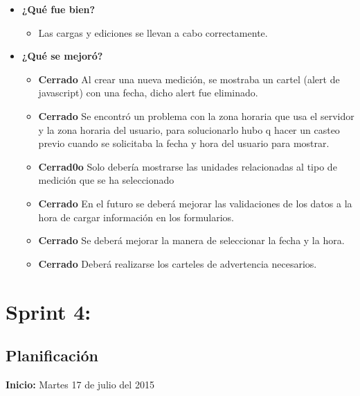 \documentclass[a4paper,12pt]{article}
\begin{document}
	\begin{itemize}
		\item \textbf{¿Qué fue bien?}
        	\begin{itemize}
				\item        Las cargas y ediciones se llevan a cabo correctamente.
			\end{itemize}

   		\item \textbf{¿Qué se mejoró?}
        	\begin{itemize}
				\item \textbf{Cerrado} Al crear una nueva medición, se mostraba un cartel (alert de javascript) con una fecha, dicho alert fue eliminado.
                \item \textbf{Cerrado} Se encontró un problema con la zona horaria que usa el servidor y la zona horaria del usuario, para solucionarlo hubo q hacer un casteo previo cuando se solicitaba la fecha y hora del usuario para mostrar.
			\end{itemize}

        	\begin{itemize}
		        \item \textbf{Cerrad0o} Solo debería mostrarse las unidades relacionadas al tipo de medición que se ha seleccionado 
				\item \textbf{Cerrado} En el futuro se deberá mejorar las validaciones de los datos a la hora de cargar información en los formularios.
        		\item \textbf{Cerrado} Se deberá mejorar la manera de seleccionar la fecha y la hora. 
                \item \textbf{Cerrado} Deberá realizarse los carteles de advertencia necesarios.
            \end{itemize}
       
	\end{itemize}
\section{Sprint 4: }%
\subsection{Planificación}

\textbf{Inicio: }Martes 17 de julio del 2015 
\end{document}
